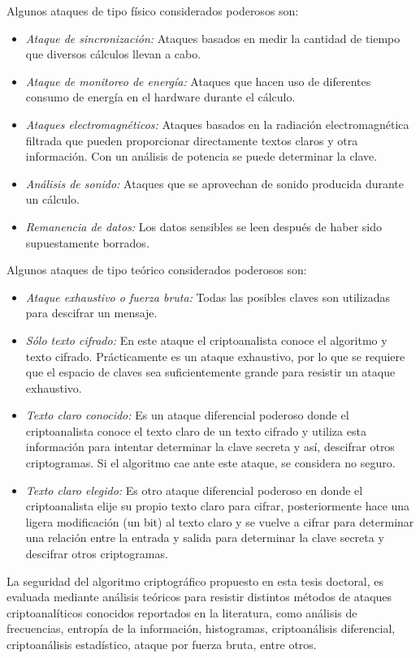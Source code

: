 Algunos ataques de tipo físico considerados poderosos son: 
\begin{itemize}
\item \textit{Ataque de sincronización:} Ataques basados en medir la cantidad de tiempo que diversos cálculos llevan a cabo.
\item \textit{Ataque de monitoreo de energía:} Ataques que hacen uso de diferentes consumo de energía en el hardware durante el cálculo.
\item \textit{Ataques electromagnéticos:} Ataques basados en la radiación electromagnética filtrada que pueden proporcionar directamente textos claros y otra información. Con un análisis de potencia se puede determinar la clave. 
\item \textit{Análisis de sonido:} Ataques que se aprovechan de sonido producida durante un cálculo.
\item \textit{Remanencia de datos:} Los datos sensibles se leen después de haber sido supuestamente borrados.\\
\end{itemize}

Algunos ataques de tipo teórico considerados poderosos son: 
\begin{itemize}
\item \textit{Ataque exhaustivo o fuerza bruta:} Todas las posibles claves son utilizadas para descifrar un mensaje.
\item \textit{Sólo texto cifrado:} En este ataque el criptoanalista conoce el algoritmo y texto
cifrado. Prácticamente es un ataque exhaustivo, por lo que se requiere que el espacio de claves sea suficientemente grande para resistir un ataque exhaustivo.
\item \textit{Texto claro conocido:} Es un ataque diferencial poderoso donde el criptoanalista conoce el texto claro de un texto cifrado y utiliza esta información para intentar determinar la clave secreta y así, descifrar otros criptogramas. Si el algoritmo cae ante este ataque, se considera no seguro.
\item \textit{Texto claro elegido:} Es otro ataque diferencial poderoso en donde el criptoanalista elije su propio texto claro para cifrar, posteriormente hace una ligera modificación (un bit) al texto claro y se vuelve a cifrar para determinar una relación entre la entrada y salida para determinar la clave secreta y descifrar otros criptogramas. \\
\end{itemize}

La seguridad del algoritmo criptográfico propuesto en esta tesis doctoral, es evaluada mediante análisis teóricos para resistir distintos métodos de ataques criptoanalíticos conocidos reportados en la literatura, como análisis de frecuencias, entropía de la información, histogramas, criptoanálisis diferencial, criptoanálisis estadístico, ataque por fuerza bruta, entre otros.  

